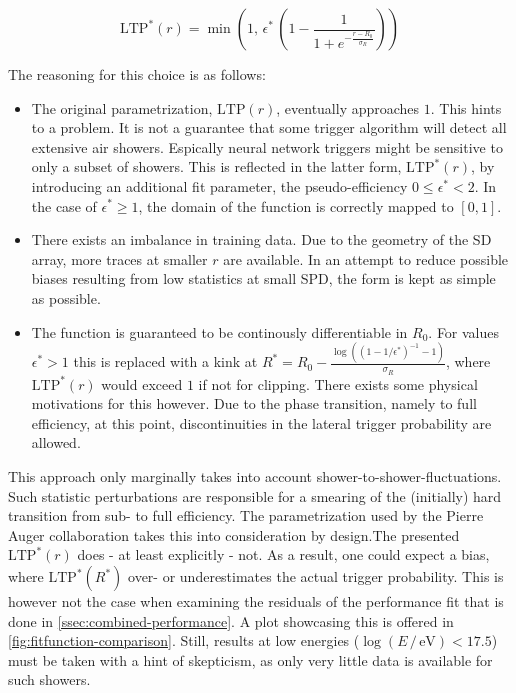 \begin{equation}
	\label{eq:my-ltp}
	\text{LTP}^*(r) = \min\left(1,\,\epsilon^*\,\left(1 - \frac{1}{1+e^{-\frac{r-R_0}{\sigma_R}}}\right)\right)
\end{equation}

The reasoning for this choice is as follows:

\begin{itemize}
	\item The original parametrization, $\text{LTP}(r)$, eventually approaches $1$. This hints to a problem. It is not a guarantee that some trigger algorithm will
	detect all extensive air showers. Espically neural network triggers  might be sensitive to only a subset of showers. This is reflected in the latter form, 
	$\text{LTP}^*(r)$, by introducing an additional fit parameter, the pseudo-efficiency $0\leq\epsilon^*<2$. In the case of $\epsilon^*\geq1$, the domain of the 
	function is correctly mapped to $[0, 1]$.

	\item There exists an imbalance in training data. Due to the geometry of the SD array, more traces at smaller $r$ are available. In an attempt to reduce 
	possible biases resulting from low statistics at small SPD, the form is kept as simple as possible.

	\item The function is guaranteed to be continously differentiable in $R_0$. For values $\epsilon^* > 1$ this is replaced with a kink at 
	$R^* = R_0 - \frac{\log\left(\left(1 - 1/\epsilon^*\right)^{-1}-1\right)}{\sigma_R}$, where $\text{LTP}^*(r)$ would exceed $1$ if not for clipping. There 
	exists some physical motivations for this however. Due to the phase transition, namely to full efficiency, at this point, discontinuities in the lateral 
	trigger probability are allowed.
\end{itemize}

This approach only marginally takes into account shower-to-shower-fluctuations. Such statistic perturbations are responsible for a smearing of the (initially)
hard transition from sub- to full efficiency. The parametrization used by the Pierre Auger collaboration takes this into consideration by design.The presented 
$\text{LTP}^*(r)$ does - at least explicitly - not. As a result, one could expect a bias, where $\text{LTP}^*(R^*)$ over- or underestimates the actual trigger 
probability. This is however not the case when examining the residuals of the performance fit that is done in \autoref{ssec:combined-performance}. A plot 
showcasing this is offered in \autoref{fig:fitfunction-comparison}. Still, results at low energies ($\log(E\,/\,\mathrm{eV}) < 17.5$) must be taken with a hint of 
skepticism, as only very little data is available for such showers.

